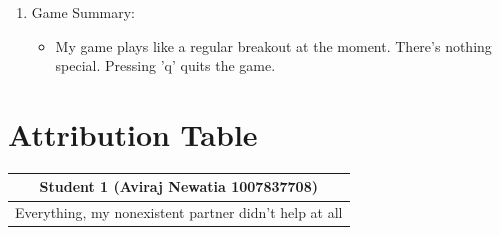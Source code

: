 \documentclass{article}
\begin{document}
\begin{enumerate}
\item Game Summary:
\begin{itemize}
\item My game plays like a regular breakout at the moment. There's nothing special. Pressing 'q' quits the game.
\end{itemize}

    
\end{enumerate}

\section{Attribution Table}

\begin{center}
\begin{tabular}{|| c ||}
\hline
 Student 1 (Aviraj Newatia 1007837708) \\ 
 \hline
 Everything, my nonexistent partner didn't help at all \\ 
 \hline
\end{tabular}
\end{center}

\end{document}
